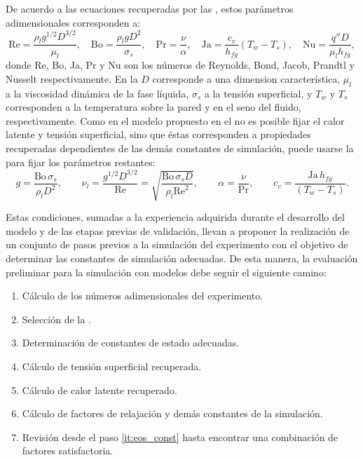 De acuerdo a las ecuaciones recuperadas por las \lbe{}, estos par\'ametros adimensionales corresponden a:
\begin{equation}
	\mbox{Re} = \dfrac{\rho_l g^{1/2} D^{3/2}}{\mu_l}, \quad
	\mbox{Bo} = \dfrac{\rho_l g D^2}{\sigma_s}, \quad
	\mbox{Pr} = \dfrac{\nu}{\alpha}, \quad
	\mbox{Ja} = \dfrac{c_v}{h_{fg}}(T_w-T_s), \quad
	\mbox{Nu} = \dfrac{q'' D}{\mu_l h_{fg}},
	\label{eq:num_adim_hetb_3D}
\end{equation}
donde Re, Bo, Ja, Pr y Nu son los n\'umeros de Reynolds, Bond, Jacob, Prandtl y Nusselt respectivamente. En la  $D$ corresponde a una dimension caracter\'istica, $\mu_l$ a la viscosidad din\'amica de la fase l\'iquida, $\sigma_s$ a la tensi\'on superficial, y $T_w$ y $T_s$ corresponden a la temperatura sobre la pared y en el seno del fluido, respectivamente. Como en el modelo propuesto en el  no es posible fijar el calor latente y tensi\'on superficial, sino que \'estas corresponden a propiedades recuperadas dependientes de las dem\'as constantes de simulaci\'on, puede usarse la  para fijar los par\'ametros restantes:
\begin{equation}
	g = \dfrac{\mbox{Bo} \, \sigma_s}{\rho_l D^2}, \qquad
	\nu_l = \dfrac{g^{1/2}D^{3/2}}{\mbox{Re}} = \sqrt{ \dfrac{\mbox{Bo} \, \sigma_s D}{\rho_l \mbox{Re}^2} }, \qquad
	\alpha = \dfrac{\nu}{\mbox{Pr}}, \qquad
	c_v = \dfrac{\mbox{Ja} \, h_{fg}}{(T_w - T_s)}.
	\label{eq:param_adim_3D}
\end{equation}


Estas condiciones, sumadas a la experiencia adquirida durante el desarrollo del modelo y de las etapas previas de validaci\'on, llevan a proponer la realizaci\'on de un conjunto de pasos previos a la simulaci\'on del experimento con el objetivo de determinar las constantes de simulaci\'on adecuadas. De esta manera, la evaluaci\'on preliminar para la simulaci\'on con modelos \pp{} debe seguir el siguiente camino:
\begin{enumerate}
	\item C\'alculo de los n\'umeros adimensionales del experimento.
	\item Selecci\'on de la \eos{}.
	\item Determinaci\'on de constantes de estado adecuadas. \label{it:eos_const}
	\item C\'alculo de tensi\'on superficial recuperada.
	\item C\'alculo de calor latente recuperado.
	\item C\'alculo de factores de relajaci\'on y dem\'as constantes de la simulaci\'on.
	\item Revisi\'on desde el paso \ref{it:eos_const} hasta encontrar una combinaci\'on de factores satisfactoria.
\end{enumerate}

